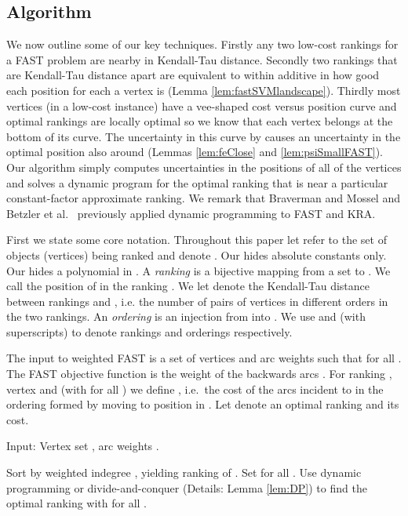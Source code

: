 \documentclass[envcountsame,oribibl]{llncs}
\newcommand{\fast}{\textsc{FAST}}
\begin{document}
\subsection{Algorithm} \label{sec:fastAlg}

We now outline some of our key techniques. Firstly any two low-cost rankings for a FAST problem are nearby in Kendall-Tau distance. Secondly two rankings that are Kendall-Tau distance  apart are equivalent to within additive  in how good each position for each a vertex is (Lemma \ref{lem:fastSVMlandscape}). Thirdly most vertices (in a low-cost instance) have a vee-shaped cost versus position curve and optimal rankings are locally optimal so we know that each vertex belongs at the bottom of its curve. The uncertainty in this curve by  causes an uncertainty in the optimal position also around  (Lemmas \ref{lem:feClose} and \ref{lem:psiSmallFAST}). Our algorithm simply computes uncertainties  in the positions of all of the vertices  and solves a dynamic program for the optimal ranking that is near a particular constant-factor approximate ranking. We remark that Braverman and Mossel \cite{Braverman08} and Betzler et al.~\cite{Betzler08,Betzler09} previously applied dynamic programming to \fast{} and KRA.

First we state some core notation. Throughout this paper let  refer to the set of objects (vertices) being ranked and  denote . Our  hides absolute constants only. Our  hides a polynomial in . A \emph{ranking} is a bijective mapping from a set  to . We call  the position of  in the ranking . We let  denote the Kendall-Tau distance between rankings  and , i.e. the number of pairs of vertices in different orders in the two rankings.
An \emph{ordering} is an injection from  into . We use  and  (with superscripts) to denote rankings  and orderings respectively.

The input to weighted \fast{} is a set  of vertices and arc weights  such that  for all . 
The \fast{} objective function is the weight of the backwards arcs . For ranking , vertex  and  (with  for all ) we define , i.e.\ the cost of the arcs incident to  in the ordering formed by moving  to position  in .
Let  denote an optimal ranking and  its cost.

\begin{algorithm}[t]
Input: Vertex set , arc weights .
\begin{algorithmic}[1]
\STATE Sort by weighted indegree \cite{Coppersmith06}, yielding ranking  of .
\STATE Set  for all .
\STATE Use dynamic programming or divide-and-conquer (Details: Lemma \ref{lem:DP}) to find the optimal ranking  with  for all .
\end{algorithmic}
\caption{Exact algorithm for FAST. If dynamic programming is used in the last line the runtime and space are both . If divide-and-conquer is used the runtime is  and the space is .}
\label{alg:exactFAST}
\end{algorithm}
\end{document}
